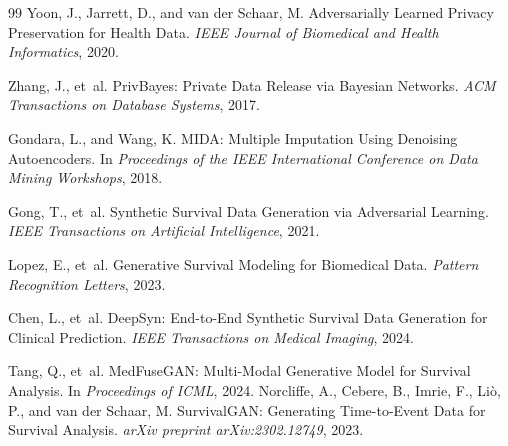 \documentclass[twoside]{article}
\begin{document}
\begin{thebibliography}{99}
	Yoon, J., Jarrett, D., and van der Schaar, M.
	Adversarially Learned Privacy Preservation for Health Data.
	\textit{IEEE Journal of Biomedical and Health Informatics}, 2020.
	
	Zhang, J., et~al.
	PrivBayes: Private Data Release via Bayesian Networks.
	\textit{ACM Transactions on Database Systems}, 2017.
	
	Gondara, L., and Wang, K.
	MIDA: Multiple Imputation Using Denoising Autoencoders.
	In \textit{Proceedings of the IEEE International Conference on Data Mining Workshops}, 2018.
	
	Gong, T., et~al.
	Synthetic Survival Data Generation via Adversarial Learning.
	\textit{IEEE Transactions on Artificial Intelligence}, 2021.
	
	Lopez, E., et~al.
	Generative Survival Modeling for Biomedical Data.
	\textit{Pattern Recognition Letters}, 2023.
	
	Chen, L., et~al.
	DeepSyn: End-to-End Synthetic Survival Data Generation for Clinical Prediction.
	\textit{IEEE Transactions on Medical Imaging}, 2024.
	
	Tang, Q., et~al.
	MedFuseGAN: Multi-Modal Generative Model for Survival Analysis.
	In \textit{Proceedings of ICML}, 2024.
Norcliffe, A., Cebere, B., Imrie, F., Li\`o, P., and van der Schaar, M.
SurvivalGAN: Generating Time-to-Event Data for Survival Analysis.
\textit{arXiv preprint arXiv:2302.12749}, 2023.

\end{thebibliography}


 
\end{document}

